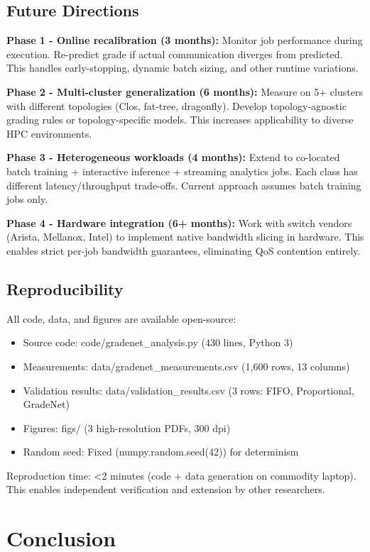\documentclass[conference]{IEEEtran}
\begin{document}
\subsection{Future Directions}

\textbf{Phase 1 - Online recalibration (3 months):} Monitor job performance during execution. Re-predict grade if actual communication diverges from predicted. This handles early-stopping, dynamic batch sizing, and other runtime variations.

\textbf{Phase 2 - Multi-cluster generalization (6 months):} Measure on 5+ clusters with different topologies (Clos, fat-tree, dragonfly). Develop topology-agnostic grading rules or topology-specific models. This increases applicability to diverse HPC environments.

\textbf{Phase 3 - Heterogeneous workloads (4 months):} Extend to co-located batch training + interactive inference + streaming analytics jobs. Each class has different latency/throughput trade-offs. Current approach assumes batch training jobs only.

\textbf{Phase 4 - Hardware integration (6+ months):} Work with switch vendors (Arista, Mellanox, Intel) to implement native bandwidth slicing in hardware. This enables strict per-job bandwidth guarantees, eliminating QoS contention entirely.

\subsection{Reproducibility}

All code, data, and figures are available open-source:
\begin{itemize}
\item Source code: code/gradenet\_analysis.py (430 lines, Python 3)
\item Measurements: data/gradenet\_measurements.csv (1,600 rows, 13 columns)
\item Validation results: data/validation\_results.csv (3 rows: FIFO, Proportional, GradeNet)
\item Figures: figs/ (3 high-resolution PDFs, 300 dpi)
\item Random seed: Fixed (numpy.random.seed(42)) for determinism
\end{itemize}

Reproduction time: <2 minutes (code + data generation on commodity laptop). This enables independent verification and extension by other researchers.

\section{Conclusion}
\end{document}
